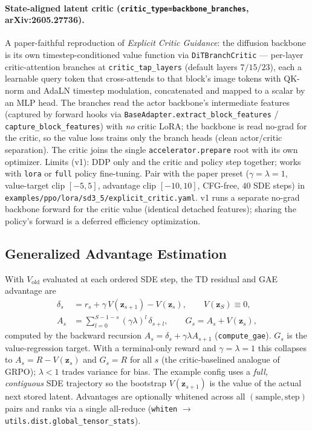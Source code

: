 \documentclass[11pt]{article}
\theoremstyle{plain}
\theoremstyle{remark}
\newcommand{\zt}{\bm{z}}
\begin{document}
\paragraph{State-aligned latent critic (\texttt{critic\_type=backbone\_branches}, arXiv:2605.27736).}
A paper-faithful reproduction of \emph{Explicit Critic Guidance}: the diffusion backbone is
its own timestep-conditioned value function via \texttt{DiTBranchCritic} --- per-layer
critic-attention branches at \texttt{critic\_tap\_layers} (default layers $7/15/23$), each a
learnable query token that cross-attends to that block's image tokens with QK-norm and
AdaLN timestep modulation, concatenated and mapped to a scalar by an MLP head. The branches
read the actor backbone's intermediate features (captured by forward hooks via
\texttt{BaseAdapter.extract\_block\_features} / \texttt{capture\_block\_features}) with
\emph{no} critic LoRA; the backbone is read no-grad for the critic, so the value loss trains
only the branch heads (clean actor/critic separation). The critic joins the single
\texttt{accelerator.prepare} root with its own optimizer. Limits (v1): DDP only and the critic
and policy step together; works with \texttt{lora} or \texttt{full} policy fine-tuning. Pair
with the paper preset ($\gamma=\lambda=1$, value-target clip $[-5,5]$, advantage clip
$[-10,10]$, CFG-free, $40$ SDE steps) in \texttt{examples/ppo/lora/sd3\_5/explicit\_critic.yaml}.
v1 runs a separate no-grad backbone forward for the critic value (identical detached features);
sharing the policy's forward is a deferred efficiency optimization.

\subsection{Generalized Advantage Estimation}
\label{sec:gae}

With $V_{\mathrm{old}}$ evaluated at each ordered SDE step, the TD residual and GAE
advantage are
\begin{align}
\delta_s &= r_s + \gamma\, V(\zt_{s+1}) - V(\zt_s),
  \qquad V(\zt_S)\equiv 0,\\
A_s &= \sum_{l=0}^{S-1-s} (\gamma\lambda)^l\, \delta_{s+l},
  \qquad
G_s = A_s + V(\zt_s),
\end{align}
computed by the backward recursion $A_s = \delta_s + \gamma\lambda A_{s+1}$
(\texttt{compute\_gae}). $G_s$ is the value-regression target. With a terminal-only
reward and $\gamma=\lambda=1$ this collapses to $A_s = R - V(\zt_s)$ and $G_s = R$ for
all $s$ (the critic-baselined analogue of GRPO); $\lambda<1$ trades variance for
bias. The example config uses a \emph{full, contiguous} SDE trajectory so the
bootstrap $V(\zt_{s+1})$ is the value of the actual next stored latent. Advantages are
optionally whitened across all $(\text{sample},\text{step})$ pairs and ranks via a
single all-reduce (\texttt{whiten} $\to$ \texttt{utils.dist.global\_tensor\_stats}).
\end{document}

